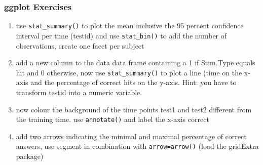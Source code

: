 \begin{frame}\frametitle{ggplot Exercises}
  \begin{enumerate}
  \item use \texttt{stat\_summary()} to plot the mean inclusive the 95 percent confidence interval per time (testid) and use \texttt{stat\_bin()} to add the number of observations, create one facet per subject
  \item add a new column to the data data frame containing a 1 if Stim.Type equals hit and 0 otherwise, now use \texttt{stat\_summary()} to plot a line (time on the x-axis and the percentage of correct hits on the y-axis. Hint: you have to transform testid into a numeric variable.
  \item now colour the background of the time points test1 and test2 different from the training time. use \texttt{annotate()} and label the x-axis correct
  \item add two arrows indicating the minimal and maximal percentage of correct answers, use segment in combination with \texttt{arrow=arrow()} (load the gridExtra package)
  \end{enumerate}
\end{frame}


